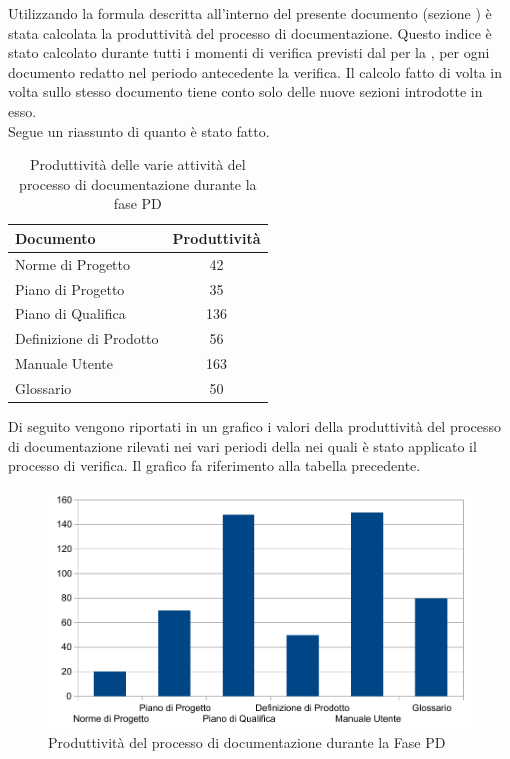 			Utilizzando la formula descritta all'interno del presente documento (sezione ) è stata calcolata la produttività del processo di documentazione. Questo indice è stato calcolato durante tutti i momenti di verifica previsti dal  per la , per ogni documento redatto nel periodo antecedente la verifica. Il calcolo fatto di volta in volta sullo stesso documento tiene conto solo delle nuove sezioni introdotte in esso.\\
			Segue un riassunto di quanto è stato fatto.
			\begin{table}[H]
			      \centering
					\begin{tabu}{| l | c |}
					\hline
					Documento & Produttività	\\ \hline
					Norme di Progetto	& 42 \\ \hline
					Piano di Progetto	& 35 \\ \hline
					Piano di Qualifica	& 136 \\ \hline
					Definizione di Prodotto & 56 \\ \hline
					Manuale Utente & 163 \\ \hline
					Glossario & 50 \\ \hline
					\end{tabu}
					\caption{Produttività delle varie attività del processo di documentazione durante la fase PD}
			\end{table}
			
			
			Di seguito vengono riportati in un grafico i valori della produttività del processo di documentazione rilevati nei vari periodi della  nei quali è stato applicato il processo di verifica. Il grafico fa riferimento alla tabella precedente.\\

			\begin{figure}[H]
				\centering
					\includegraphics[width=12cm]{PianoDiQualifica/Pics/ProduttivitaDocumentazioneFasePD.pdf}
				\caption{Produttività del processo di documentazione durante la Fase PD}
			\end{figure}

